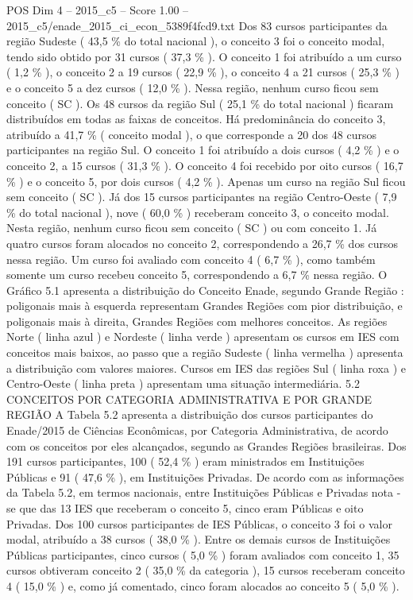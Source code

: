 \begin{textsample}{POS Dim 4 – 2015\_c5 – Score 1.00 – 2015\_c5/enade\_2015\_ci\_econ\_5389f4fcd9.txt}
Dos 83 cursos participantes da região Sudeste ( 43,5 \% do total nacional ), o conceito 3 foi o conceito modal, tendo sido obtido por 31 cursos ( 37,3 \% ).
O conceito 1 foi atribuído a um curso ( 1,2 \% ), o conceito 2 a 19 cursos ( 22,9 \% ), o conceito 4 a 21 cursos ( 25,3 \% ) e o conceito 5 a dez cursos ( 12,0 \% ).
Nessa região, nenhum curso ficou sem conceito ( SC ).
Os 48 cursos da região Sul ( 25,1 \% do total nacional ) ficaram distribuídos em todas as faixas de conceitos.
Há predominância do conceito 3, atribuído a 41,7 \% ( conceito modal ), o que corresponde a 20 dos 48 cursos participantes na região Sul.
O conceito 1 foi atribuído a dois cursos ( 4,2 \% ) e o conceito 2, a 15 cursos ( 31,3 \% ).
O conceito 4 foi recebido por oito cursos ( 16,7 \% ) e o conceito 5, por dois cursos ( 4,2 \% ).
Apenas um curso na região Sul ficou sem conceito ( SC ).
Já dos 15 cursos participantes na região Centro-Oeste ( 7,9 \% do total nacional ), nove ( 60,0 \% ) receberam conceito 3, o conceito modal.
Nesta região, nenhum curso ficou sem conceito ( SC ) ou com conceito 1.
Já quatro cursos foram alocados no conceito 2, correspondendo a 26,7 \% dos cursos nessa região.
Um curso foi avaliado com conceito 4 ( 6,7 \% ), como também somente um curso recebeu conceito 5, correspondendo a 6,7 \% nessa região.
O Gráfico 5.1 apresenta a distribuição do Conceito Enade, segundo Grande Região : poligonais mais à esquerda representam Grandes Regiões com pior distribuição, e poligonais mais à direita, Grandes Regiões com melhores conceitos.
As regiões Norte ( linha azul ) e Nordeste ( linha verde ) apresentam os cursos em IES com conceitos mais baixos, ao passo que a região Sudeste ( linha vermelha ) apresenta a distribuição com valores maiores.
Cursos em IES das regiões Sul ( linha roxa ) e Centro-Oeste ( linha preta ) apresentam uma situação intermediária. 5.2 CONCEITOS POR CATEGORIA ADMINISTRATIVA E POR GRANDE REGIÃO A Tabela 5.2 apresenta a distribuição dos cursos participantes do Enade/2015 de Ciências Econômicas, por Categoria Administrativa, de acordo com os conceitos por eles alcançados, segundo as Grandes Regiões brasileiras.
Dos 191 cursos participantes, 100 ( 52,4 \% ) eram ministrados em Instituições Públicas e 91 ( 47,6 \% ), em Instituições Privadas.
De acordo com as informações da Tabela 5.2, em termos nacionais, entre Instituições Públicas e Privadas nota -se que das 13 IES que receberam o conceito 5, cinco eram Públicas e oito Privadas.
Dos 100 cursos participantes de IES Públicas, o conceito 3 foi o valor modal, atribuído a 38 cursos ( 38,0 \% ).
Entre os demais cursos de Instituições Públicas participantes, cinco cursos ( 5,0 \% ) foram avaliados com conceito 1, 35 cursos obtiveram conceito 2 ( 35,0 \% da categoria ), 15 cursos receberam conceito 4 ( 15,0 \% ) e, como já comentado, cinco foram alocados ao conceito 5 ( 5,0 \% ).

\end{textsample}

